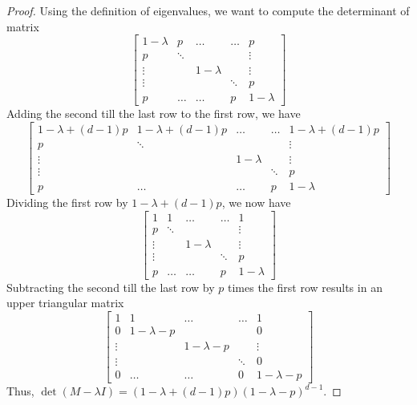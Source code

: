 \begin{proof}
    Using the definition of eigenvalues, we want to compute the determinant of matrix 
    \begin{equation*}
        \begin{bmatrix} 
            1 - \lambda & p & \dots & \dots & p \\
            p & \ddots &  &  & \vdots\\
            \vdots & & 1 - \lambda  &  & \vdots\\
            \vdots & &   & \ddots & p\\
            p &   \dots     & \dots  & p & 1 - \lambda
            \end{bmatrix}
    \end{equation*}
    Adding the second till the last row to the first row, we have
    \begin{equation*}
    \begin{bmatrix} 
            1 - \lambda + (d-1)p & 1 - \lambda + (d-1)p & \dots & \dots & 1 - \lambda + (d-1)p \\
            p & \ddots &  &  & \vdots\\
            \vdots & & 1 - \lambda  &  & \vdots\\
            \vdots & &   & \ddots & p\\
            p &   \dots     & \dots  & p & 1 - \lambda
    \end{bmatrix}
    \end{equation*}
    Dividing the first row by $1 - \lambda + (d-1)p$, we now have 
    \begin{equation*}
    \begin{bmatrix} 
            1 & 1 & \dots & \dots & 1 \\
            p & \ddots &  &  & \vdots\\
            \vdots & & 1 - \lambda  &  & \vdots\\
            \vdots & &   & \ddots & p\\
            p &   \dots     & \dots  & p & 1 - \lambda
    \end{bmatrix}
    \end{equation*}
    Subtracting the second till the last row by $p$ times the first row results in an upper triangular matrix
    \begin{equation*}
    \begin{bmatrix} 
            1 & 1 & \dots & \dots & 1 \\
            0 & 1 - \lambda - p &  &  & 0\\
            \vdots & & 1 - \lambda - p  &  & \vdots\\
            \vdots & &   & \ddots & 0\\
            0 &   \dots     & \dots  & 0 & 1 - \lambda - p
    \end{bmatrix}
    \end{equation*}
    Thus, $\det(M - \lambda I) = (1 - \lambda + (d-1)p)(1 - \lambda - p)^{d-1}$.
\end{proof}

